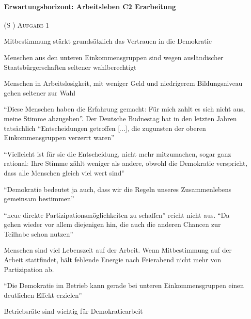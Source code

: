 \paragraph{Erwartungshorizont: Arbeitsleben C2 Erarbeitung} (\gls{S} \pageref{ARBEITSLEBEN-C2})
\textsc{Aufgabe 1} \quad 
\begin{myitemize}
    \item Mitbestimmung stärkt grundsätzlich das Vertrauen in die Demokratie
    \item Menschen aus den unteren Einkommensgruppen sind wegen ausländischer Staatsbürgerschaften seltener wahlberechtigt
    \item Menschen in Arbeitslosigkeit, mit weniger Geld und niedrigerem Bildungsniveau gehen seltener zur Wahl
    \item \enquote{Diese Menschen haben die Erfahrung gemacht: Für mich zahlt es sich nicht aus, meine Stimme abzugeben}. Der Deutsche Budnestag hat in den letzten Jahren tatsächlich \enquote{Entscheidungen getroffen [...], die zugunsten der oberen Einkommensgruppen verzerrt waren} \autocite{Elsasser.2017}
    \item \enquote{Vielleicht ist für sie die Entscheidung, nicht mehr mitzumachen, sogar ganz rational: Ihre Stimme zählt weniger als andere, obwohl die Demokratie verspricht, dass alle Menschen gleich viel wert sind}
    \item \enquote{Demokratie bedeutet ja auch, dass wir die Regeln unseres Zusammenlebens gemeinsam bestimmen}
    \item \enquote{neue direkte Partizipationsmöglichkeiten zu schaffen} reicht nicht aus. \enquote{Da gehen wieder vor allem diejenigen hin, die auch die anderen Chancen zur Teilhabe schon nutzen}
    \item Menschen sind viel  Lebenszeit auf der Arbeit. Wenn Mitbestimmung auf der Arbeit stattfindet, hält fehlende Energie nach Feierabend nicht mehr von Partizipation ab. 
    \item \enquote{Die Demokratie im Betrieb kann gerade bei unteren Einkommensgruppen einen deutlichen Effekt erzielen}
    \item Betriebsräte sind wichtig für Demokratiearbeit
\end{myitemize}

